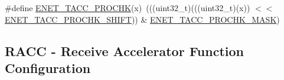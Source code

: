 \begin{DoxyCompactItemize}
\item 
\#define \mbox{\hyperlink{group___e_n_e_t___register___masks_gac97bc66334d681b22a2e66614d0f0900}{E\+N\+E\+T\+\_\+\+T\+A\+C\+C\+\_\+\+P\+R\+O\+C\+HK}}(x)~(((uint32\+\_\+t)(((uint32\+\_\+t)(x)) $<$$<$ \mbox{\hyperlink{group___e_n_e_t___register___masks_ga1ab45d57f4375fd64bc08ca9cb53341b}{E\+N\+E\+T\+\_\+\+T\+A\+C\+C\+\_\+\+P\+R\+O\+C\+H\+K\+\_\+\+S\+H\+I\+FT}})) \& \mbox{\hyperlink{group___e_n_e_t___register___masks_gad5d647fe5be39e4571d94f84415f4613}{E\+N\+E\+T\+\_\+\+T\+A\+C\+C\+\_\+\+P\+R\+O\+C\+H\+K\+\_\+\+M\+A\+SK}})
\end{DoxyCompactItemize}
\subsection*{R\+A\+CC -\/ Receive Accelerator Function Configuration}
